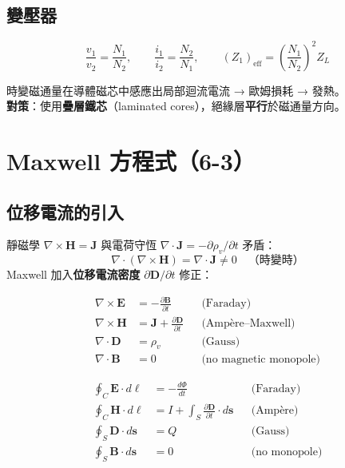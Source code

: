 \documentclass[12pt,a4paper]{article}
\newcommand{\vE}{\mathbf{E}}
\newcommand{\vB}{\mathbf{B}}
\newcommand{\vH}{\mathbf{H}}
\newcommand{\vJ}{\mathbf{J}}
\newcommand{\vD}{\mathbf{D}}
\begin{document}
\subsection{變壓器}

\begin{notebox}[理想變壓器（$\mu\to\infty$, $\mathcal{R}=0$）]
\[
\frac{v_1}{v_2} = \frac{N_1}{N_2}, \qquad
\frac{i_1}{i_2} = \frac{N_2}{N_1}, \qquad
(Z_1)_{\text{eff}} = \left(\frac{N_1}{N_2}\right)^2 Z_L
\]
\end{notebox}

\begin{warnbox}
時變磁通量在導體磁芯中感應出局部迴流電流 → 歐姆損耗 → 發熱。\\
\textbf{對策}：使用\textbf{疊層鐵芯}（laminated cores），絕緣層\textbf{平行}於磁通量方向。
\end{warnbox}

\section{Maxwell 方程式（6-3）}

\subsection{位移電流的引入}

靜磁學 $\nabla\times\vH = \vJ$ 與電荷守恆 $\nabla\cdot\vJ = -\partial\rho_v/\partial t$ 矛盾：
\[
\nabla\cdot(\nabla\times\vH) = \nabla\cdot\vJ \neq 0 \quad\text{（時變時）}
\]
Maxwell 加入\textbf{位移電流密度} $\partial\vD/\partial t$ 修正：

\begin{keybox}
\[
\begin{aligned}
\nabla\times\vE &= -\frac{\partial\vB}{\partial t} & &\text{(Faraday)} \\[4pt]
\nabla\times\vH &= \vJ + \frac{\partial\vD}{\partial t} & &\text{(Amp\`{e}re--Maxwell)} \\[4pt]
\nabla\cdot\vD &= \rho_v & &\text{(Gauss)} \\[4pt]
\nabla\cdot\vB &= 0 & &\text{(no magnetic monopole)}
\end{aligned}
\]
\end{keybox}

\begin{keybox}
\[
\begin{aligned}
\oint_C \vE\cdot d\boldsymbol{\ell} &= -\frac{d\Phi}{dt} & &\text{(Faraday)} \\[4pt]
\oint_C \vH\cdot d\boldsymbol{\ell} &= I + \int_S \frac{\partial\vD}{\partial t}\cdot d\mathbf{s} & &\text{(Amp\`{e}re)} \\[4pt]
\oint_S \vD\cdot d\mathbf{s} &= Q & &\text{(Gauss)} \\[4pt]
\oint_S \vB\cdot d\mathbf{s} &= 0 & &\text{(no monopole)}
\end{aligned}
\]
\end{keybox}
\end{document}
